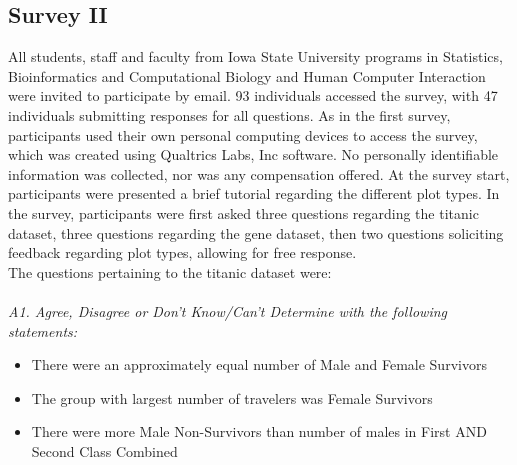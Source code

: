 
% 




\subsection*{Survey II}\label{app2}
All students, staff and faculty from Iowa State University programs in Statistics, Bioinformatics and Computational Biology and Human Computer Interaction were invited to participate by email. 93 individuals accessed the survey, with 47 individuals submitting responses for all questions. As in the first survey, participants used their own personal computing devices to access the survey, which was created using Qualtrics Labs, Inc software. No personally identifiable information was collected, nor was any compensation offered. At the survey start, participants were presented a brief tutorial regarding the different plot types. In the survey, participants were first asked three questions regarding the titanic dataset, three questions regarding the gene dataset, then two questions soliciting feedback regarding plot types, allowing for free response. \\

\noindent The questions pertaining to the titanic dataset were: \\ \\
\emph{A1. Agree, Disagree or Don't Know/Can't Determine with the following statements:}
\begin{itemize}
\item There were an approximately equal number of Male and Female Survivors
\item The group with largest number of travelers was Female Survivors
\item There were more Male Non-Survivors than number of males in First AND Second Class Combined
\end{itemize}

